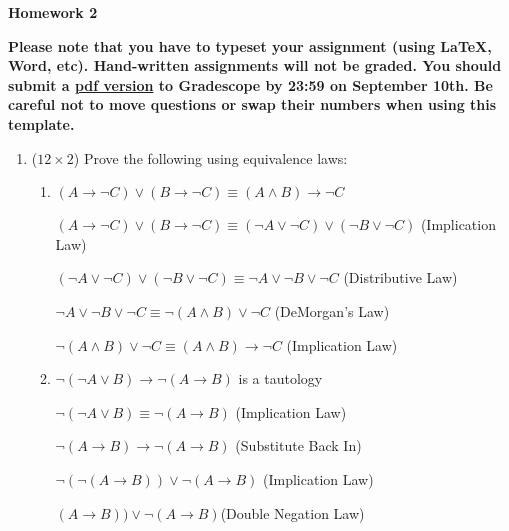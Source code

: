 \documentclass[12pt]{article}
\date{}
\begin{document}
\begin{flushleft}
\large \bf
Homework 2 \\
\end{flushleft}
{\bf
Please note that you have to typeset your assignment (using \LaTeX, Word, etc).
Hand-written assignments will not be graded.
You should submit a \underline{pdf version} to Gradescope by 23:59 on September 10th. Be careful not to move questions or swap their numbers when using this template.
}

\begin{enumerate}

\item ($12 \times 2$)
Prove the following using equivalence laws:

\begin{enumerate}
\item
$(A \to \lnot C) \lor (B \to \lnot C) \equiv (A \land B) \to \lnot C$

$(A \to \lnot C) \lor (B \to \lnot C) \equiv (\lnot A \lor \lnot C) \lor (\lnot B \lor \lnot C)$ \hfill(Implication Law)

$(\lnot A \lor \lnot C) \lor (\lnot B \lor \lnot C) \equiv \lnot A \lor \lnot B \lor \lnot C$ \hfill(Distributive Law)

$\lnot A \lor \lnot B \lor \lnot C \equiv \lnot(A \land B) \lor \lnot C$ \hfill(DeMorgan's Law)

$\lnot(A \land B) \lor \lnot C \equiv (A \land B) \to \lnot C$ \hfill(Implication Law)

\clearpage
\item
$\lnot (\lnot A \lor B) \to  \lnot (A \to B)$ is a tautology

$\lnot (\lnot A \lor B) \equiv \lnot (A \to B)$ \hfill(Implication Law)

$\lnot (A \to B) \to \lnot (A \to B)$ \hfill(Substitute Back In)

$\lnot(\lnot (A \to B)) \lor \lnot (A \to B)$ \hfill(Implication Law)

$ (A \to B)) \lor \lnot (A \to B)$\hfill(Double Negation Law)


\end{enumerate}
\end{enumerate}
\end{document}
